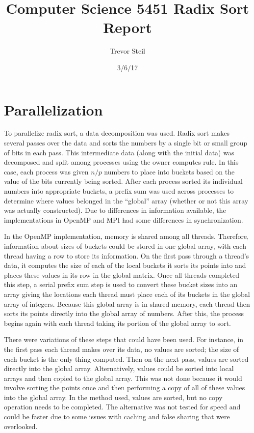 \documentclass[a4paper]{article}
\title{Computer Science 5451 Radix Sort Report }
\date{3/6/17}
\author{Trevor Steil}
\begin{document}
\maketitle

\section{Parallelization}

To parallelize radix sort, a data decomposition was used. Radix sort makes several passes over the data and sorts the numbers by a single bit or small
group of bits in each pass. This intermediate data (along with the initial data) was decomposed and split among processes using the owner computes
rule. In this case, each process was given $n/p$ numbers to place into buckets based on the value of the bits currently being sorted. After each
process sorted its individual numbers into appropriate buckets, a prefix sum was used across processes to determine where values belonged in the
``global'' array (whether or not this array was actually constructed). Due to differences in information available, the implementations in OpenMP and
MPI had some differences in synchronization.

In the OpenMP implementation, memory is shared among all threads. Therefore, information about sizes of buckets could be stored in one global array, with
each thread having a row to store its information. On the first pass through a thread's data, it computes the size of each of the local buckets it
sorts its points into and places these values in its row in the global matrix. Once all threads completed this step, a serial prefix sum step is used
to convert these bucket sizes into an array giving the locations each thread must place each of its buckets in the global array of integers. Because
this global array is in shared memory, each thread then sorts its points directly into the global array of numbers. After this, the process begins
again with each thread taking its portion of the global array to sort.

There were variations of these steps that could have been used. For instance, in the first pass each thread makes over its data, no values are sorted;
the size of each bucket is the only thing computed. Then on the next pass, values are sorted directly into the global array. Alternatively, values
could be sorted into local arrays and then copied to the global array. This was not
done because it would involve sorting the points once and then performing a copy of all of these values into the global array. In the method used,
values are sorted, but no copy operation needs to be completed. The alternative was not tested for speed and could be
faster due to some issues with caching and false sharing that were overlooked.
\end{document}
